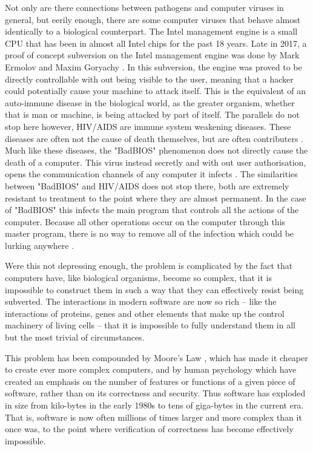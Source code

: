 Not only are there connections between pathogens and computer viruses in general, but eerily enough, there are some computer viruses that behave almost identically to a biological counterpart. 
The Intel management engine is a small CPU that has been in almost all Intel chips for the past 18 years. 
Late in 2017, a proof of concept subversion on the Intel management engine was done by Mark Ermolov and Maxim Goryachy \cite{Hackaday}. In this subversion, the engine was proved to be directly controllable with out being visible to the user, meaning that a hacker could potentially cause your machine to attack itself. 
This is the equivalent of an auto-immune disease in the biological world, as the greater organism, whether that is man or machine, is being attacked by part of itself. 
The parallels do not stop here however, HIV/AIDS are immune system weakening diseases. 
These diseases are often not the cause of death themselves, but are often contributers \cite{ggHIV}. 
Much like these diseases, the "BadBIOS" phenomenon does not directly cause the death of a computer. 
This virus instead secretly and with out user authorisation, opens the communication channels of any computer it infects \cite{Reference5}. 
The similarities between "BadBIOS" and HIV/AIDS does not stop there, both are extremely resistant to treatment to the point where they are almost permanent. 
In the case of "BadBIOS" this infects the main program that controls all the actions of the computer. 
Because all other operations occur on the computer through this master program, there is no way to remove all of the infection which could be lurking anywhere \cite{Reference5}.

Were this not depressing enough, the problem is complicated by the fact that computers have, like biological organisms,
become so complex, that it is impossible to construct them in such a way that they can effectively resist being subverted.
The interactions in modern software are now so rich -- like the interactions of proteins, genes and other elements that make up
the control machinery of living cells -- that it is impossible to fully understand them in all but the most trivial of circumstances.

This problem has been compounded by Moore's Law \cite{Moore}, which has made it cheaper to create ever more complex computers, and
by human psychology which have created an emphasis on the number of features or functions of a given piece of software, rather than
on its correctness and security.  
Thus software has exploded in size from kilo-bytes in the early 1980s to tens of giga-bytes in the current era. 
That is, software is now often millions of times larger and more complex than it once was, to the point where verification of correctness has become effectively impossible.

